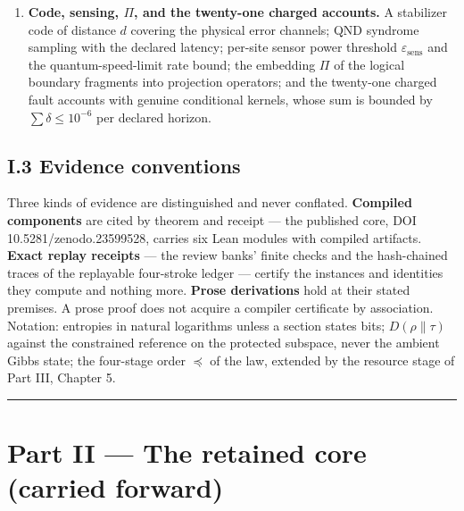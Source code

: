 \documentclass[
]{article}
\begin{document}
\begin{enumerate}
  administration at the Landauer floor together with emulation overhead;
  adversarial sub-threshold absorption; and the minimal-hold drain that
  quarantine requires. Income originates outside the escrow network and
  inside the one structure (P1); redistribution within the network ---
  the authority-attenuation tax --- is never a source.
\item
  \textbf{Code, sensing, \(\Pi\), and the twenty-one charged accounts.}
  A stabilizer code of distance \(d\) covering the physical error
  channels; QND syndrome sampling with the declared latency; per-site
  sensor power threshold \(\varepsilon_{\mathrm{sens}}\) and the
  quantum-speed-limit rate bound; the embedding \(\Pi\) of the logical
  boundary fragments into projection operators; and the twenty-one
  charged fault accounts with genuine conditional kernels, whose sum is
  bounded by \(\sum\delta\le10^{-6}\) per declared horizon.
\end{enumerate}

\subsection{I.3 Evidence conventions}\label{i.3-evidence-conventions}

Three kinds of evidence are distinguished and never conflated.
\textbf{Compiled components} are cited by theorem and receipt --- the
published core, DOI 10.5281/zenodo.23599528, carries six Lean modules
with compiled artifacts. \textbf{Exact replay receipts} --- the review
banks' finite checks and the hash-chained traces of the replayable
four-stroke ledger --- certify the instances and identities they compute
and nothing more. \textbf{Prose derivations} hold at their stated
premises. A prose proof does not acquire a compiler certificate by
association. Notation: entropies in natural logarithms unless a section
states bits; \(D(\rho\|\tau)\) against the constrained reference on the
protected subspace, never the ambient Gibbs state; the four-stage order
\(\preceq\) of the law, extended by the resource stage of Part III,
Chapter 5.

\begin{center}\rule{0.5\linewidth}{0.5pt}\end{center}

\section{Part II --- The retained core (carried
forward)}\label{part-ii-the-retained-core-carried-forward}
\end{document}

